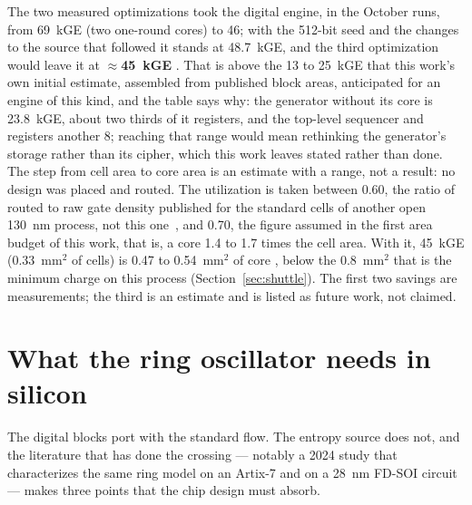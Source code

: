The two measured optimizations took the digital engine, in the October
runs, from 69~kGE (two one-round cores) to 46; with the 512-bit seed and
the changes to the source that followed it stands at 48.7~kGE, and the
third optimization would leave it at
\textbf{$\approx$45~kGE} \est{}. That is above the 13 to 25~kGE that this
work's own initial estimate, assembled from published block areas,
anticipated for an engine of this kind, and the table says why: the
generator without its core is 23.8~kGE, about two thirds of it
registers, and the
top-level sequencer and registers another 8; reaching that range
would mean rethinking the generator's storage rather than its cipher,
which this work leaves stated rather than done.
The step from cell area to core area is an estimate with a range, not a
result: no design was placed and routed. The utilization is taken
between 0.60, the ratio of routed to raw gate density published for the
standard cells of another open 130~nm process, not this
one~\cite{skywater_pdk_cells}, and 0.70, the figure assumed in the
first area budget of this work, that is, a core 1.4 to 1.7 times the cell area. With it, 45~kGE
(0.33~mm$^2$ of cells) is 0.47 to 0.54~mm$^2$ of core \est{}, below the
0.8~mm$^2$ that is the minimum charge on this process
(Section~\ref{sec:shuttle}). The first two savings are measurements; the
third is an estimate and is listed as future work, not claimed.

\section{What the ring oscillator needs in silicon}
\label{sec:ro_silicon}

The digital blocks port with the standard flow. The entropy source does
not, and the literature that has done the crossing --- notably a 2024
study that characterizes the same ring model on an Artix-7 and on a 28~nm
FD-SOI circuit~\cite{benea_2024_flicker} --- makes three points that the
chip design must absorb.

